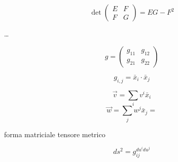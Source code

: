 $$
\det \begin{pmatrix} E & F \\ F & G \end{pmatrix} = EG - F^2
$$

\dots

\newpage

$$
g = \begin{pmatrix}
    g_{11} & g_{12} \\
    g_{21} & g_{22}
\end{pmatrix}
$$

$$
g_{i,j} = \bar x_i \cdot \bar x_j
$$

$$
\vec v = \sum_i v^i \bar x_i
$$
$$
\vec w = \sum_j w^j \bar x_j = 
$$

forma matriciale tensore metrico

$$
ds^2 = g_{ij}^{du^i du^j}
$$